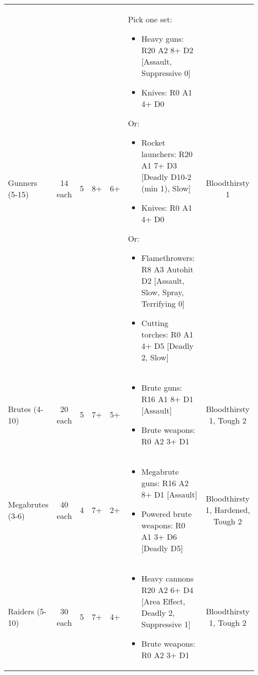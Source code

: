\documentclass[landscape]{extarticle}
\begin{document}
\begin{small}
\begin{tabular}{UccccWS}
\\



Gunners (5-15)
&
14 each
&
5
&
8+
&
6+
&
Pick one set:
\begin{itemize}
    \item Heavy guns: R20 A2 8+ D2 [Assault, Suppressive 0]
    \item Knives: R0 A1 4+ D0
\end{itemize}
Or:
\begin{itemize}
    \item Rocket launchers: R20 A1 7+ D3 [Deadly D10-2 (min 1), Slow]
    \item Knives: R0 A1 4+ D0
\end{itemize}
Or:
\begin{itemize}
    \item Flamethrowers: R8 A3 Autohit D2 [Assault, Slow, Spray, Terrifying 0]
    \item Cutting torches: R0 A1 4+ D5 [Deadly 2, Slow]
\end{itemize}
&
Bloodthirsty 1


\\


Brutes (4-10)
&
20 each
&
5
&
7+
&
5+
&
\begin{itemize}
    \item Brute guns: R16 A1 8+ D1 [Assault]
    \item Brute weapons: R0 A2 3+ D1
\end{itemize}
&
Bloodthirsty 1, Tough 2


\\


Megabrutes (3-6)
&
40 each
&
4
&
7+
&
2+
&
\begin{itemize}
    \item Megabrute guns: R16 A2 8+ D1 [Assault]
    \item Powered brute weapons: R0 A1 3+ D6 [Deadly D5]
\end{itemize}
&
Bloodthirsty 1, Hardened, Tough 2


\\


Raiders (5-10)
&
30 each
&
5
&
7+
&
4+
&
\begin{itemize}
    \item Heavy cannons R20 A2 6+ D4 [Area Effect, Deadly 2, Suppressive 1]
    \item Brute weapons: R0 A2 3+ D1
\end{itemize}
&
Bloodthirsty 1, Tough 2
\end{tabular}









\end{small}
\end{document}
